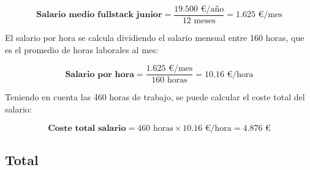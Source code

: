 \begin{equation}
    \textbf{Salario medio fullstack junior} =  \frac {\text{19.500 €/año} }{ \text{12 meses}} = \text{1.625 €/mes}
\end{equation}

El salario por hora se calcula dividiendo el salario mensual entre 160 horas, que es el promedio de horas laborales al mes:

\begin{equation}
    \textbf{Salario por hora} = \frac {\text{1.625 €/mes}}{160 \text{ horas}} = \text{10,16 €/hora}
\end{equation}

Teniendo en cuenta las 460 horas de trabajo, se puede calcular el coste total del salario:

\begin{equation}
    \textbf{Coste total salario} = \text{460 horas} \times \text{10.16 €/hora} = \text{4.876 €}
\end{equation}







\subsection*{Total}

